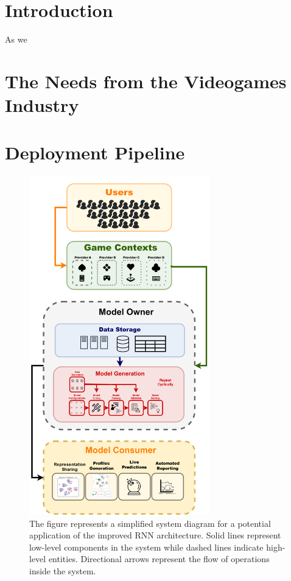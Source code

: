 \section{Introduction}
\label{industry_needs}
As we 

\section{The Needs from the Videogames Industry}
\label{industry_needs}
\lorem

\section{Deployment Pipeline}
\label{industry_needs}
\begin{figure}[ht]
\centering
\includegraphics[width=0.7\textwidth]{images/chapter_5/pipeline_diagram.png}
\caption[\textbf{Model Deployment Pipeline}]{The figure represents a simplified system diagram for a potential application of the improved RNN architecture. Solid lines represent low-level components in the system while dashed lines indicate high-level entities. Directional arrows represent the flow of operations inside the system.}
\label{pipeline}
\end{figure}


